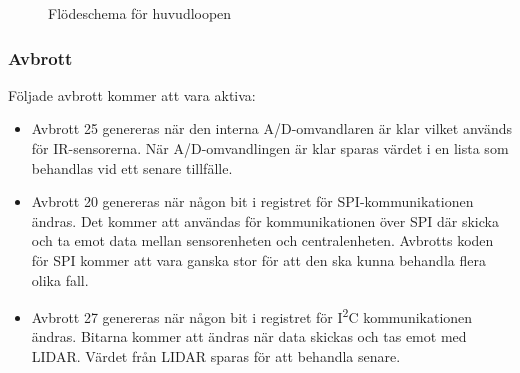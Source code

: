 \documentclass[a4paper,titlepage,12pt]{article}
\newcommand{\itc}{I\textsuperscript{2}C}
\begin{document}
    \begin{figure}[h!]
        \caption{Flödeschema för huvudloopen\label{fig:sensor_flow}}
    \end{figure}

    \newpage

    \subsubsection{Avbrott}
	Följade avbrott kommer att vara aktiva:
    \begin{itemize}
        \item Avbrott 25 genereras när den interna A/D-omvandlaren är klar 
            vilket används för IR-sensorerna. När A/D-omvandlingen är klar 
            sparas värdet i en lista som behandlas vid ett senare tillfälle.
        \item Avbrott 20 genereras när någon bit i registret för SPI-kommunikationen
            ändras. Det kommer att användas för kommunikationen över SPI där skicka och 
            ta emot data mellan sensorenheten och centralenheten. Avbrotts koden för 
            SPI kommer att vara ganska stor för att den ska kunna behandla flera olika fall.
        \item Avbrott 27 genereras när någon bit i registret för \itc{} kommunikationen 
            ändras. Bitarna kommer att ändras när data skickas och tas emot med LIDAR.
            Värdet från LIDAR sparas för att behandla senare.
    \end{itemize}
\end{document}
